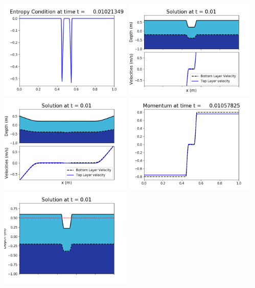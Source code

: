 \documentclass[11pt]{article}
\begin{document}
\vskip 10pt 
\includegraphics[width=0.475\textwidth]{frame0029fig1009.png}
\vskip 10pt 
\includegraphics[width=0.475\textwidth]{frame0030fig1001.png}
\includegraphics[width=0.475\textwidth]{frame0030fig1002.png}
\vskip 10pt 
\includegraphics[width=0.475\textwidth]{frame0030fig1003.png}
\includegraphics[width=0.475\textwidth]{frame0030fig1006.png}
\end{document}
